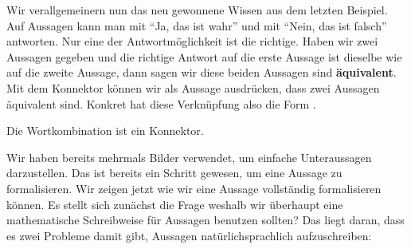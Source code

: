 \documentclass[../../main.tex]{subfiles}
\begin{document}
Wir verallgemeinern nun das neu gewonnene Wissen aus dem letzten Beispiel. Auf Aussagen kann man mit \enquote{Ja, das ist wahr} und mit \enquote{Nein, das ist falsch} antworten. Nur eine der Antwortmöglichkeit ist die richtige. Haben wir zwei Aussagen gegeben und die richtige Antwort auf die erste Aussage ist dieselbe wie auf die zweite Aussage, dann sagen wir diese beiden Aussagen sind \textbf{äquivalent}. Mit dem Konnektor  können wir als Aussage ausdrücken, dass zwei Aussagen äquivalent sind. Konkret hat diese Verknüpfung also die Form .

\begin{lemma}{}
    Die Wortkombination  ist ein Konnektor.
\end{lemma}

Wir haben bereits mehrmals Bilder verwendet, um einfache Unteraussagen darzustellen. Das ist bereits ein Schritt gewesen, um eine Aussage zu formalisieren. Wir zeigen jetzt wie wir eine Aussage vollständig formalisieren können. Es stellt sich zunächst die Frage weshalb wir überhaupt eine mathematische Schreibweise für Aussagen benutzen sollten? Das liegt daran, dass es zwei Probleme damit gibt, Aussagen natürlichsprachlich aufzuschreiben:
\end{document}
